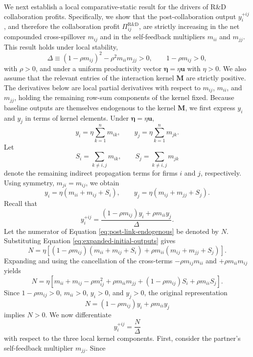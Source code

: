 We next establish a local comparative-static result for the drivers of R\&D collaboration profits. Specifically, we show that the post-collaboration output $y_i^{+ij}$, and therefore the collaboration profit $\Pi_{ij}^{\mathrm{R\&D}}$, are strictly increasing in the net compounded cross-spillover $m_{ij}$ and in the self-feedback multipliers $m_{ii}$ and $m_{jj}$. This result holds under local stability,
\[
\Delta \equiv (1-\rho m_{ij})^2-\rho^2m_{ii}m_{jj} > 0, \qquad 1-\rho m_{ij}>0,
\]
with $\rho>0$, and under a uniform productivity vector $\bm{\eta}=\eta\mathbf{u}$ with $\eta>0$. We also assume that the relevant entries of the interaction kernel $\mathbf{M}$ are strictly positive. The derivatives below are local partial derivatives with respect to $m_{ij}$, $m_{ii}$, and $m_{jj}$, holding the remaining row-sum components of the kernel fixed. Because baseline outputs are themselves endogenous to the kernel $\mathbf{M}$, we first express $y_i$ and $y_j$ in terms of kernel elements. Under $\bm{\eta}=\eta\mathbf{u}$,
\[
y_i = \eta\sum_{k=1}^n m_{ik}, \qquad y_j = \eta\sum_{k=1}^n m_{jk}.
\]
Let
\[
S_i = \sum_{k\neq i,j}m_{ik}, \qquad S_j = \sum_{k\neq i,j}m_{jk}
\]
denote the remaining indirect propagation terms for firms $i$ and $j$, respectively. Using symmetry, $m_{ji}=m_{ij}$, we obtain
\begin{equation}
y_i = \eta(m_{ii}+m_{ij}+S_i), \qquad y_j = \eta(m_{ij}+m_{jj}+S_j).
\label{eq:expanded-initial-outputs}
\end{equation}
Recall that
\begin{equation}
y_i^{+ij} = \frac{ (1-\rho m_{ij})y_i+\rho m_{ii}y_j }{ \Delta }.
\label{eq:post-link-endogenous}
\end{equation}
Let the numerator of Equation \eqref{eq:post-link-endogenous} be denoted by $N$. Substituting Equation \eqref{eq:expanded-initial-outputs} gives
\[
N = \eta \left[ (1-\rho m_{ij})(m_{ii}+m_{ij}+S_i) + \rho m_{ii}(m_{ij}+m_{jj}+S_j) \right].
\]
Expanding and using the cancellation of the cross-terms $-\rho m_{ij}m_{ii}$ and $+\rho m_{ii}m_{ij}$ yields
\begin{equation}
N = \eta \left[ m_{ii} + m_{ij} - \rho m_{ij}^2 + \rho m_{ii}m_{jj} + (1-\rho m_{ij})S_i + \rho m_{ii}S_j \right].
\label{eq:numerator-expanded}
\end{equation}
Since $1-\rho m_{ij}>0$, $m_{ii}>0$, $y_i>0$, and $y_j>0$, the original representation
\[
N = (1-\rho m_{ij})y_i+\rho m_{ii}y_j
\]
implies $N>0$. We now differentiate
\[
y_i^{+ij} = \frac{N}{\Delta}
\]
with respect to the three local kernel components. First, consider the partner's self-feedback multiplier $m_{jj}$. Since
